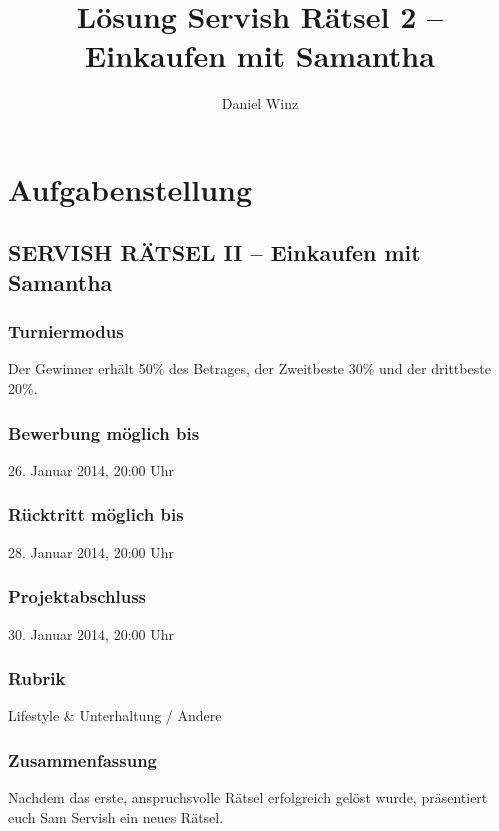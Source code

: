 \documentclass[a4paper, 10pt, fleqn]{article}
\title{Lösung Servish Rätsel 2 -- Einkaufen mit Samantha}
\author{Daniel Winz}
\begin{document}
\maketitle
\newpage
\tableofcontents
\newpage

\section{Aufgabenstellung}

\subsection*{SERVISH RÄTSEL II -- Einkaufen mit Samantha}

\subsubsection*{Turniermodus}
Der Gewinner erhält 50\% des Betrages, der Zweitbeste 30\% und der drittbeste 20\%. 

\subsubsection*{Bewerbung möglich bis}
26. Januar 2014, 
20:00 Uhr 

\subsubsection*{Rücktritt möglich bis}
28. Januar 2014, 
20:00 Uhr 

\subsubsection*{Projektabschluss}
30. Januar 2014, 
20:00 Uhr 

\subsubsection*{Rubrik}
Lifestyle \& Unterhaltung / Andere

\subsubsection*{Zusammenfassung}
Nachdem das erste, anspruchsvolle Rätsel erfolgreich gelöst wurde, präsentiert 
euch Sam Servish ein neues Rätsel. 
\end{document}
